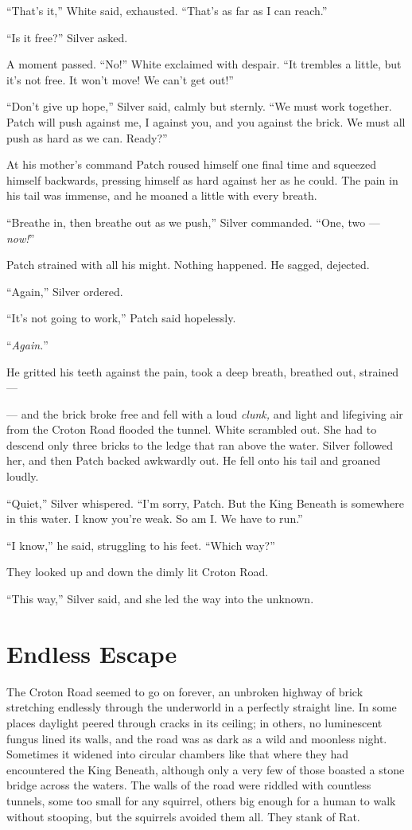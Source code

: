 \documentclass[12pt]{memoir}
\begin{document}
“That’s it,” White said, exhausted. “That’s as far as I can reach.”

“Is it free?” Silver asked.

A moment passed. “No!” White exclaimed with despair. “It trembles a
little, but it’s not free. It won’t move! We can’t get out!”

“Don’t give up hope,” Silver said, calmly but sternly. “We must work
together. Patch will push against me, I against you, and you against
the brick. We must all push as hard as we can. Ready?”

At his mother’s command Patch roused himself one final time and
squeezed himself backwards, pressing himself as hard against her as he
could. The pain in his tail was immense, and he moaned a little with
every breath.

“Breathe in, then breathe out as we push,” Silver commanded. “One, two
— \textit{now!}”

Patch strained with all his might. Nothing happened. He sagged,
dejected.

“Again,” Silver ordered.

“It’s not going to work,” Patch said hopelessly.

“\textit{Again.}”

He gritted his teeth against the pain, took a deep breath, breathed
out, strained —

— and the brick broke free and fell with a loud \textit{clunk,} and
light and lifegiving air from the Croton Road flooded the
tunnel. White scrambled out. She had to descend only three bricks to
the ledge that ran above the water. Silver followed her, and then
Patch backed awkwardly out. He fell onto his tail and groaned loudly.

“Quiet,” Silver whispered. “I’m sorry, Patch. But the King Beneath is
somewhere in this water. I know you’re weak. So am I. We have to run.”

“I know,” he said, struggling to his feet. “Which way?”

They looked up and down the dimly lit Croton Road.

“This way,” Silver said, and she led the way into the unknown.


\section{Endless Escape}

The Croton Road seemed to go on forever, an unbroken highway of brick
stretching endlessly through the underworld in a perfectly straight
line. In some places daylight peered through cracks in its ceiling; in
others, no luminescent fungus lined its walls, and the road was as
dark as a wild and moonless night. Sometimes it widened into circular
chambers like that where they had encountered the King Beneath,
although only a very few of those boasted a stone bridge across the
waters. The walls of the road were riddled with countless tunnels,
some too small for any squirrel, others big enough for a human to walk
without stooping, but the squirrels avoided them all. They stank of
Rat.
\end{document}
